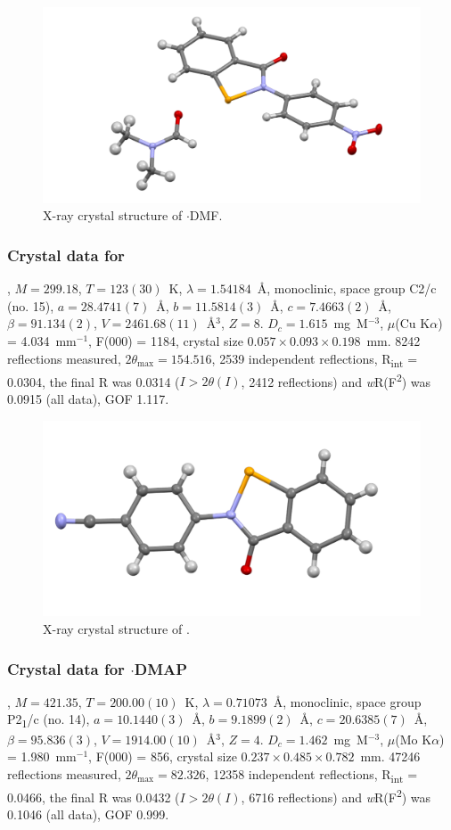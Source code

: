 \begin{refsection}
\begin{figure}
  \includegraphics[width=0.6\linewidth]{Figures/ebs-4no2-dmf-xtal.pdf}
  \caption{X-ray crystal structure of \texorpdfstring{$ \cdot $DMF}{C16 H15 N3 O4 Se}.}
\end{figure}

\subsubsection{Crystal data for \texorpdfstring{}{C14 H8 N2 O Se}}
, $M=299.18$, $T=123(30)$~K, $\lambda=1.54184$~\AA, monoclinic, space group C2/c (no. 15), $a = 28.4741(7)$~\AA, $b = 11.5814(3)$~\AA, $c = 7.4663(2)$~\AA, $\beta = 91.134(2)$\degree, $V = 2461.68(11)$~\AA$^{3}$, $Z = 8$. $D_{c}= 1.615$~mg~M$^{-3}$, $\mu$(Cu K$\alpha$) = 4.034~mm$^{-1}$, F(000) = 1184, crystal size $0.057 \times 0.093 \times 0.198$~mm. 8242 reflections measured, $2\theta_{\max}=154.516$\degree, 2539 independent reflections, R\textsubscript{int} = 0.0304, the final R was 0.0314 ($I > 2\theta(I)$, 2412 reflections) and \textit{w}R(F\textsuperscript{2}) was 0.0915 (all data), GOF 1.117.

\begin{figure}
  \includegraphics[width=0.6\linewidth]{Figures/ebs-4cn-xtal.pdf}
  \caption{X-ray crystal structure of \texorpdfstring{}{C14 H8 N2 O Se}.}
\end{figure}

\subsubsection{Crystal data for \texorpdfstring{$ \cdot $DMAP}{C21 H18 N4 O Se}}
, $M=421.35$, $T=200.00(10)$~K, $ \lambda=0.71073 $~\AA, monoclinic, space group P2\textsubscript{1}/c (no. 14), $a = 10.1440(3)$~\AA, $b = 9.1899(2)$~\AA, $c = 20.6385(7)$~\AA, $\beta = 95.836(3)$\degree, $V = 1914.00(10)$~\AA$^{3}$, $Z = 4$. $D_{c}= 1.462$~mg~M$^{-3}$, $\mu$(Mo K$\alpha$) = 1.980~mm$^{-1}$, F(000) = 856, crystal size $0.237 \times 0.485 \times 0.782$~mm. 47246 reflections measured, $2\theta_{\max}=82.326$\degree, 12358 independent reflections, R\textsubscript{int} = 0.0466, the final R was 0.0432 ($I > 2\theta(I)$, 6716 reflections) and \textit{w}R(F\textsuperscript{2}) was 0.1046 (all data), GOF 0.999.


\end{refsection}
